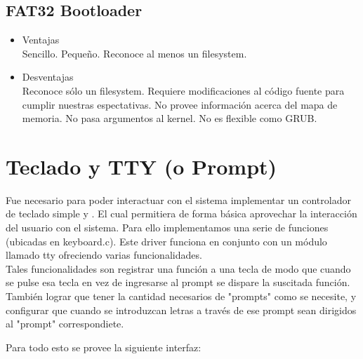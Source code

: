\documentclass[a4paper,10pt]{article}
\begin{document}
\subsection{FAT32 Bootloader}

\begin{itemize}
\item Ventajas
\\
Sencillo.
Pequeño.
Reconoce al menos un filesystem.

\item Desventajas 
\\
Reconoce sólo un filesystem.
Requiere modificaciones al código fuente para cumplir nuestras espectativas.
No provee información acerca del mapa de memoria.
No pasa argumentos al kernel.
No es flexible como GRUB.
\end{itemize}



\newpage

\newpage




\newpage










\newpage
\section{Teclado y TTY (o Prompt)}
Fue necesario para poder interactuar con el sistema implementar un controlador de teclado simple y . El cual permitiera de forma básica aprovechar la interacción del usuario con el sistema. Para ello implementamos una serie de funciones (ubicadas en keyboard.c). Este driver funciona en conjunto con un módulo llamado tty ofreciendo varias funcionalidades.\\
Tales funcionalidades son registrar una función a una tecla de modo que cuando se pulse esa tecla en vez de ingresarse al prompt se dispare la suscitada función. También lograr que tener la cantidad necesarios de "prompts" como se necesite, y configurar que cuando se introduzcan letras a través de ese prompt sean dirigidos al "prompt" correspondiete.

Para todo esto se provee la siguiente interfaz:
\end{document}
